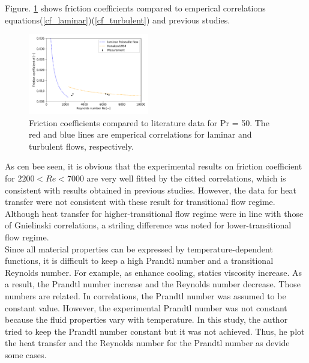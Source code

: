 \documentclass[conference]{IEEEtran}
\begin{document}
Figure. \ref{recf_pr50} shows friction coefficients compared to emperical correlations equations(\ref{cf_laminar})(\ref{cf_turbulent}) and previous studies.
\begin{figure}[htbp]
  \centering
  \vspace{5zh}
  \includegraphics[width=0.47\textwidth,natwidth=400,natheight=200]{fig/recf_pr50.pdf}
  \caption{Friction coefficients compared to literature data for Pr = 50. The red and blue lines are emperical correlations for laminar and turbulent flows, respectively.}
  \label{recf_pr50}
\end{figure}
As cen bee seen, it is obvious that the experimental results on friction coefficient for $2200 < Re < 7000$ are very well fitted by the citted correlations, which is consistent with results obtained in previous studies.
However, the data for heat transfer were not consistent with these result for transitional flow regime.
Although heat transfer for higher-transitional flow regime were in line with those of Gnielinski\cite{Gnienlinski2010} correlations, a striling difference was noted for lower-transitional flow regime.\\
Since all material properties can be expressed by temperature-dependent functions, it is difficult to keep a high Prandtl number and a transitional Reynolds number.
For example, as enhance cooling, statics viscosity increase.
As a result, the Prandtl number increase and the Reynolds number decrease.
Those numbers are related.
In correlations, the Prandtl number was assumed to be constant value.
However, the experimental Prandtl number was not constant because the fluid properties vary with temperature.
In this study, the author tried to keep the Prandtl number constant but it was not achieved.
Thus, he plot the heat transfer and the Reynolds number for the Prandtl number as devide some cases.
\end{document}
